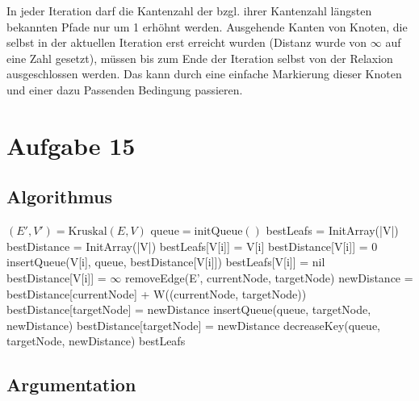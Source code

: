 \documentclass[parskip=half,a4paper]{scrartcl}
\begin{document}
In jeder Iteration darf die Kantenzahl der bzgl. ihrer Kantenzahl längsten bekannten Pfade nur um 1 erhöhnt werden. Ausgehende Kanten von Knoten, die selbst in der aktuellen Iteration erst erreicht wurden (Distanz wurde von $\infty$ auf eine Zahl gesetzt), müssen bis zum Ende der Iteration selbst von der Relaxion ausgeschlossen werden. Das kann durch eine einfache Markierung dieser Knoten und einer dazu Passenden Bedingung passieren.

\section*{Aufgabe 15}

\subsection*{Algorithmus}

\begin{algorithmic}[1]
 
\State $(E',V') = \text{Kruskal}(E, V)$ 
\State $\text{queue} = \text{initQueue}()$
\State bestLeafs = InitArray(|V|)
\State bestDistance = InitArray(|V|)
 
 
\State bestLeafs[V[i]] = V[i]
\State bestDistance[V[i]] = 0
\State insertQueue(V[i], queue, bestDistance[V[i]]) 
\Else {}
\State bestLeafs[V[i]] = nil
\State bestDistance[V[i]] = $\infty$
\EndIf
\EndFor
{}  \label{outer} 
 \label{inner}
\State removeEdge(E', currentNode, targetNode)
\State newDistance = bestDistance[currentNode] + W((currentNode, targetNode))
\State bestDistance[targetNode] = newDistance
\State insertQueue(queue, targetNode, newDistance) 
\State bestDistance[targetNode] = newDistance
\State decreaseKey(queue, targetNode, newDistance) 
\EndIf
\EndWhile
\EndWhile
\Return bestLeafs
\EndProcedure
\end{algorithmic}


\subsection*{Argumentation}
\end{document}
